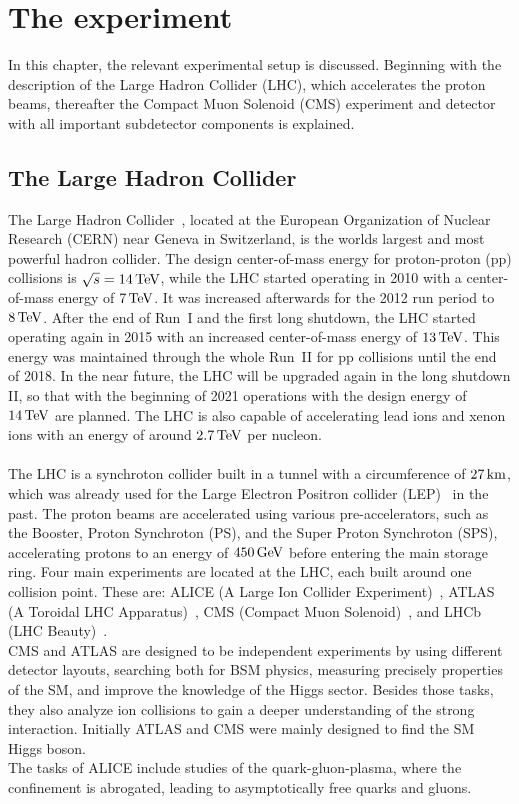 \chapter{The experiment}\label{chap:experiment}
\minitoc
In this chapter, the relevant experimental setup is discussed. Beginning with the description of the Large Hadron Collider (LHC), which accelerates the proton beams, thereafter the Compact Muon Solenoid (CMS) experiment and detector with all important subdetector components is explained.
\section{The Large Hadron Collider}\label{sec:LHC}
The Large Hadron Collider~\cite{LHC1,LHC2}, located at the European Organization of Nuclear Research (CERN) near Geneva in Switzerland, is the worlds largest and most powerful hadron collider. The design center-of-mass energy for proton-proton (pp) collisions is $\sqrt{s}=14\,\text{Te\hspace{-.08em}V}$, while the LHC started operating in 2010 with a center-of-mass energy of $7\,\text{Te\hspace{-.08em}V}$. It was increased afterwards for the 2012 run period to $8\,\text{Te\hspace{-.08em}V}$. After the end of Run~I and the first long shutdown, the LHC started operating again in 2015 with an increased center-of-mass energy of $13\,\text{Te\hspace{-.08em}V}$. This energy was maintained through the whole Run~II for pp collisions until the end of 2018. In the near future, the LHC will be upgraded again in the long shutdown II, so that with the beginning of 2021 operations with the design energy of $14\,\text{Te\hspace{-.08em}V}$ are planned.
The LHC is also capable of accelerating lead ions and xenon ions with an energy of around $2.7\,\text{Te\hspace{-.08em}V}$ per nucleon.\\\\
The LHC is a synchroton collider built in a tunnel with a circumference of $27\,\text{km}$, which was already used for the Large Electron Positron collider (LEP)~\cite{LEPCollider} in the past. The proton beams are accelerated using various pre-accelerators, such as the Booster, Proton Synchroton (PS), and the Super Proton Synchroton (SPS), accelerating protons to an energy of $450\,\text{Ge\hspace{-.08em}V}$ before entering the main storage ring. Four main experiments are located at the LHC, each built around one collision point. These are: ALICE (A Large Ion Collider Experiment)~\cite{ALICE}, ATLAS (A Toroidal LHC Apparatus)~\cite{ATLAS}, CMS (Compact Muon Solenoid)~\cite{CMS}, and LHCb (LHC Beauty)~\cite{LHCb}.\\
CMS and ATLAS are designed to be independent experiments by using different detector layouts, searching both for BSM physics, measuring precisely properties of the SM, and improve the knowledge of the Higgs sector. Besides those tasks, they also analyze ion collisions to gain a deeper understanding of the strong interaction. Initially ATLAS and CMS were mainly designed to find the SM Higgs boson.\\ The tasks of ALICE include studies of the quark-gluon-plasma, where the confinement is abrogated, leading to asymptotically free quarks and gluons.\\
